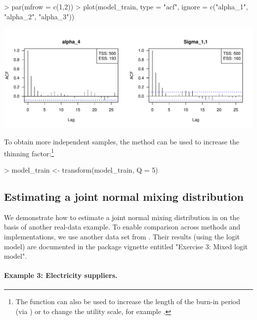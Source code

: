 \documentclass[article,shortnames]{jss}
\newcommand{\fct}[1]{\code{#1()}}
\begin{document}
\begin{Schunk}
\begin{Sinput}
> par(mfrow = c(1,2))
> plot(model_train, type = "acf", ignore = c("alpha_1", "alpha_2", "alpha_3"))
\end{Sinput}
\end{Schunk}
\includegraphics{rprobitb_oelschlaeger_bauer-model-train-acf}

To obtain more independent samples, the \fct{transform} method can be used to increase the thinning factor:\footnote{The function can also be used to increase the length of the burn-in period (via ) or to change the utility scale, for example .}

\begin{Schunk}
\begin{Sinput}
> model_train <- transform(model_train, Q = 5)
\end{Sinput}
\end{Schunk}

\subsection{Estimating a joint normal mixing distribution} \label{subsec:normal_mix}

We demonstrate how to estimate a joint normal mixing distribution in  on the basis of another real-data example. To enable comparison across methods and implementations, we use another data set from . Their results (using the logit model) are documented in the package vignette entitled "Exercise 3: Mixed logit model".

\paragraph{Example 3: Electricity suppliers.}
\end{document}
